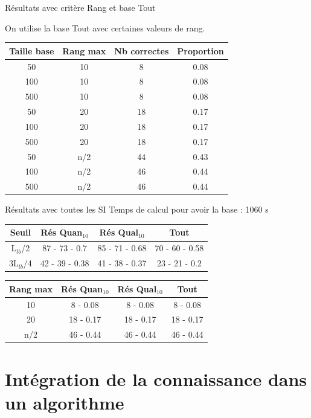 \documentclass{beamer}
\begin{document}
\begin{frame}{Résultats avec critère Rang et base Tout}

On utilise la base Tout avec certaines valeurs de rang.
\begin{tabular}{|c|c|c|c|}
   \hline
   Taille base & Rang max & Nb correctes & Proportion\\
   \hline
   50 & 10  & 8 & 0.08  \\
   \hline
   100 & 10  & 8 & 0.08  \\
   \hline
   500 & 10  & 8 & 0.08  \\
   \hline
   \hline
   50 & 20  & 18 & 0.17  \\
   \hline
   100 & 20 & 18 & 0.17  \\
   \hline
   500 & 20 & 18 & 0.17  \\
   \hline
   \hline
   50 & n/2 & 44 & 0.43  \\
   \hline
   100 & n/2 & 46 & 0.44  \\
   \hline
   500 & n/2 & 46 & 0.44  \\
   \hline
\end{tabular}
\end{frame}


\begin{frame}{Résultats avec toutes les SI}
Temps de calcul pour avoir la base : 1060 s

\centering
\begin{tabular}{|c|c|c|c|}
   \hline
   Seuil & Rés Quan$_{10}$ & Rés Qual$_{10}$ & Tout \\
   \hline
   L$_{lb}$/2 & 87 - 73 - 0.7 & 85 - 71 - 0.68 & 70 - 60 - 0.58 \\
   \hline
   3L$_{lb}$/4 & 42 - 39 - 0.38 & 41 - 38 - 0.37  & 23 - 21 - 0.2 \\
   \hline
\end{tabular}

\begin{tabular}{|c|c|c|c|}
   \hline
   Rang max & Rés Quan$_{10}$ & Rés Qual$_{10}$ & Tout \\
   \hline
   10 & 8 - 0.08 & 8 - 0.08 & 8 - 0.08 \\
   \hline
   20 & 18 - 0.17 & 18 - 0.17 & 18 - 0.17 \\
   \hline
   n/2 & 46 - 0.44 & 46 - 0.44 & 46 - 0.44 \\
   \hline
\end{tabular}

\end{frame}

\section{Intégration de la connaissance dans un algorithme}
\end{document}
